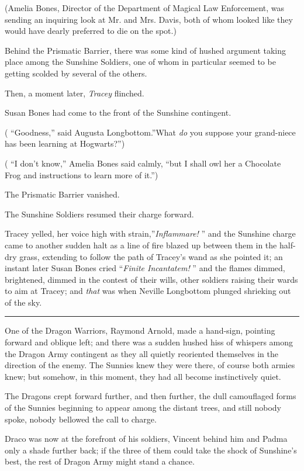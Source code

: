 (Amelia Bones, Director of the Department of Magical Law Enforcement,
was sending an inquiring look at Mr. and Mrs. Davis, both of whom looked
like they would have dearly preferred to die on the spot.)

Behind the Prismatic Barrier, there was some kind of hushed argument
taking place among the Sunshine Soldiers, one of whom in particular
seemed to be getting scolded by several of the others.

Then, a moment later, \emph{Tracey} flinched.

Susan Bones had come to the front of the Sunshine contingent.

( ``Goodness,'' said Augusta Longbottom.''What \emph{do} you suppose
your grand-niece has been learning at Hogwarts?'')

( ``I don't know,'' Amelia Bones said calmly, ``but I shall owl her a
Chocolate Frog and instructions to learn more of it.'')

The Prismatic Barrier vanished.

The Sunshine Soldiers resumed their charge forward.

Tracey yelled, her voice high with strain,''\emph{Inflammare!} '' and the
Sunshine charge came to another sudden halt as a line of fire blazed up
between them in the half-dry grass, extending to follow the path of
Tracey's wand as she pointed it; an instant later Susan Bones cried
``\emph{Finite Incantatem!} '' and the flames dimmed, brightened, dimmed
in the contest of their wills, other soldiers raising their wards to aim
at Tracey; and \emph{that} was when Neville Longbottom plunged shrieking
out of the sky.

\begin{center}\rule{3in}{0.4pt}\end{center}

One of the Dragon Warriors, Raymond Arnold, made a hand-sign, pointing
forward and oblique left; and there was a sudden hushed hiss of whispers
among the Dragon Army contingent as they all quietly reoriented
themselves in the direction of the enemy. The Sunnies knew they were
there, of course both armies knew; but somehow, in this moment, they had
all become instinctively quiet.

The Dragons crept forward further, and then further, the dull
camouflaged forms of the Sunnies beginning to appear among the distant
trees, and still nobody spoke, nobody bellowed the call to charge.

Draco was now at the forefront of his soldiers, Vincent behind him and
Padma only a shade further back; if the three of them could take the
shock of Sunshine's best, the rest of Dragon Army might stand a chance.

